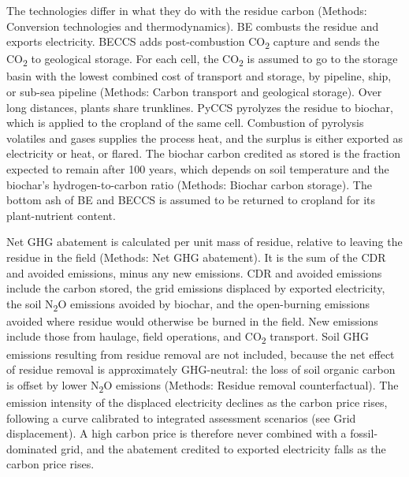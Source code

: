 \documentclass[
  letterpaper,
  twoside,
  twocolumn,
  9pt]{article}
\begin{document}
The technologies differ in what they do with the residue carbon
(Methods: Conversion technologies and thermodynamics). BE combusts the
residue and exports electricity. BECCS adds post-combustion
CO\textsubscript{2} capture and sends the CO\textsubscript{2} to
geological storage. For each cell, the CO\textsubscript{2} is assumed to
go to the storage basin with the lowest combined cost of transport and
storage, by pipeline, ship, or sub-sea pipeline (Methods: Carbon
transport and geological storage). Over long distances, plants share
trunklines. PyCCS pyrolyzes the residue to biochar, which is applied to
the cropland of the same cell. Combustion of pyrolysis volatiles and
gases supplies the process heat, and the surplus is either exported as
electricity or heat, or flared. The biochar carbon credited as stored is
the fraction expected to remain after 100 years, which depends on soil
temperature and the biochar's hydrogen-to-carbon ratio (Methods: Biochar
carbon storage). The bottom ash of BE and BECCS is assumed to be
returned to cropland for its plant-nutrient content.

Net GHG abatement is calculated per unit mass of residue, relative to
leaving the residue in the field (Methods: Net GHG abatement). It is the
sum of the CDR and avoided emissions, minus any new emissions. CDR and
avoided emissions include the carbon stored, the grid emissions
displaced by exported electricity, the soil N\textsubscript{2}O
emissions avoided by biochar, and the open-burning emissions avoided
where residue would otherwise be burned in the field. New emissions
include those from haulage, field operations, and CO\textsubscript{2}
transport. Soil GHG emissions resulting from residue removal are not
included, because the net effect of residue removal is approximately
GHG-neutral: the loss of soil organic carbon is offset by lower
N\textsubscript{2}O emissions \citep{mcclelland2025} (Methods: Residue
removal counterfactual). The emission intensity of the displaced
electricity declines as the carbon price rises, following a curve
calibrated to integrated assessment scenarios (see Grid displacement). A
high carbon price is therefore never combined with a fossil-dominated
grid, and the abatement credited to exported electricity falls as the
carbon price rises.
\end{document}
